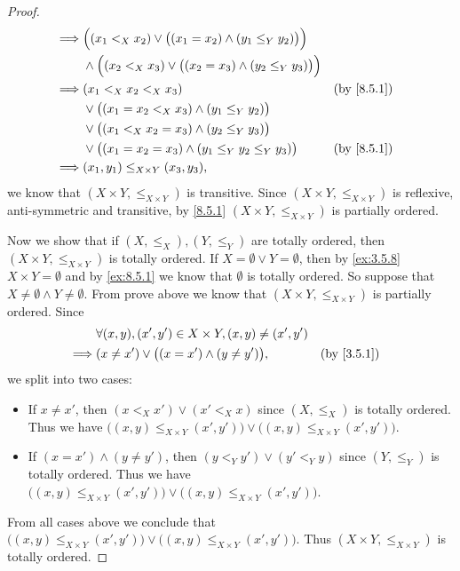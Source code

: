 \begin{proof}
\begin{align*}
    \implies & \Big((x_1 <_X x_2) \lor \big((x_1 = x_2) \land (y_1 \leq_Y y_2)\big)\Big)                                                 \\
             & \land \Big((x_2 <_X x_3) \lor \big((x_2 = x_3) \land (y_2 \leq_Y y_3)\big)\Big)                                           \\
    \implies & (x_1 <_X x_2 <_X x_3)                                                                                     &  & \by{8.5.1} \\
             & \lor \big((x_1 = x_2 <_X x_3) \land (y_1 \leq_Y y_2)\big)                                                                 \\
             & \lor \big((x_1 <_X x_2 = x_3) \land (y_2 \leq_Y y_3)\big)                                                                 \\
             & \lor \big((x_1 = x_2 = x_3) \land (y_1 \leq_Y y_2 \leq_Y y_3)\big)                                        &  & \by{8.5.1} \\
    \implies & (x_1, y_1) \leq_{X \times Y} (x_3, y_3),
  \end{align*}
  we know that \((X \times Y, \leq_{X \times Y})\) is transitive.
  Since \((X \times Y, \leq_{X \times Y})\) is reflexive, anti-symmetric and transitive, by \cref{8.5.1} \((X \times Y, \leq_{X \times Y})\) is partially ordered.

  Now we show that if \((X, \leq_X), (Y, \leq_Y)\) are totally ordered, then \((X \times Y, \leq_{X \times Y})\) is totally ordered.
  If \(X = \emptyset \lor Y = \emptyset\), then by \cref{ex:3.5.8} \(X \times Y = \emptyset\) and by \cref{ex:8.5.1} we know that \(\emptyset\) is totally ordered.
  So suppose that \(X \neq \emptyset \land Y \neq \emptyset\).
  From prove above we know that \((X \times Y, \leq_{X \times Y})\) is partially ordered.
  Since
  \begin{align*}
             & \forall (x, y), (x', y') \in X \times Y, (x, y) \neq (x', y')                 \\
    \implies & (x \neq x') \lor \big((x = x') \land (y \neq y')\big),        &  & \by{3.5.1}
  \end{align*}
  we split into two cases:
  \begin{itemize}
    \item If \(x \neq x'\), then \((x <_X x') \lor (x' <_X x)\) since \((X, \leq_X)\) is totally ordered.
          Thus we have \(\big((x, y) \leq_{X \times Y} (x', y')\big) \lor \big((x, y) \leq_{X \times Y} (x', y')\big)\).
    \item If \((x = x') \land (y \neq y')\), then \((y <_Y y') \lor (y' <_Y y)\) since \((Y, \leq_Y)\) is totally ordered.
          Thus we have \(\big((x, y) \leq_{X \times Y} (x', y')\big) \lor \big((x, y) \leq_{X \times Y} (x', y')\big)\).
  \end{itemize}
  From all cases above we conclude that \(\big((x, y) \leq_{X \times Y} (x', y')\big) \lor \big((x, y) \leq_{X \times Y} (x', y')\big)\).
  Thus \((X \times Y, \leq_{X \times Y})\) is totally ordered.


\end{proof}
